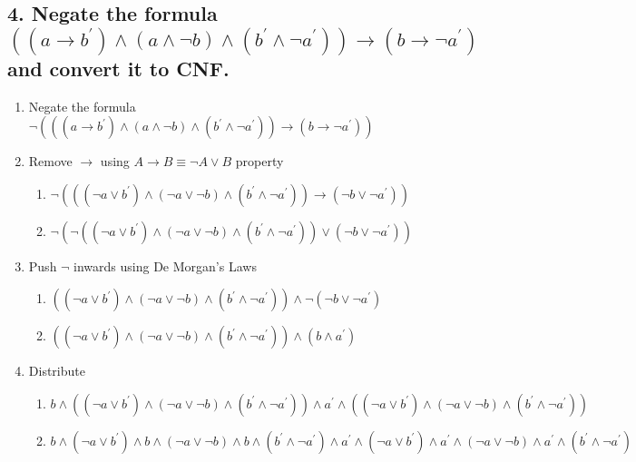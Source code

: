 \documentclass[a4paper, 14pt]{report}
\newcommand{\question}[1]{\subsection*{#1}}
\begin{document}
\question{4. Negate the formula $ ((a \rightarrow b^\prime) \wedge (a \wedge \neg b) \wedge (b^\prime \wedge \neg a^\prime)) \rightarrow (b \rightarrow \neg a^\prime) $  and convert it to CNF.\\ }

\begin{enumerate}

	\begin{enumerate}

		\item Negate the formula
			$ \neg (((a \rightarrow b^\prime) \wedge (a \wedge \neg b) \wedge (b^\prime \wedge \neg a^\prime)) \rightarrow (b \rightarrow \neg a^\prime)) $
		
		\item Remove $\rightarrow$ using $A \rightarrow B \equiv \neg A \vee B$ property

			\begin{enumerate}		
				\item $ \neg (((\neg a \vee b^\prime) \wedge (\neg a \vee \neg b) \wedge (b^\prime \wedge \neg a^\prime)) \rightarrow (\neg b \vee \neg a^\prime)) $ 
				\item $ \neg (\neg ((\neg a \vee b^\prime) \wedge (\neg a \vee \neg b) \wedge (b^\prime \wedge \neg a^\prime)) \vee (\neg b \vee \neg a^\prime)) $ 
			\end{enumerate}		

		\item Push $\neg$ inwards using De Morgan's Laws
		
			\begin{enumerate}		
				\item $ ((\neg a \vee b^\prime) \wedge (\neg a \vee \neg b) \wedge (b^\prime \wedge \neg a^\prime)) \wedge \neg (\neg b \vee \neg a^\prime) $
				\item $ ((\neg a \vee b^\prime) \wedge (\neg a \vee \neg b) \wedge (b^\prime \wedge \neg a^\prime)) \wedge (b \wedge a^\prime) $
			\end{enumerate}		

		\item Distribute

			\begin{enumerate}		
				\item $ b \wedge ((\neg a \vee b^\prime) \wedge (\neg a \vee \neg b) \wedge (b^\prime \wedge \neg a^\prime)) \wedge a^\prime \wedge  ((\neg a \vee b^\prime) \wedge (\neg a \vee \neg b) \wedge (b^\prime \wedge \neg a^\prime)) $ 
				\item $ b \wedge (\neg a \vee b^\prime) \wedge b \wedge (\neg a \vee \neg b) \wedge b \wedge (b^\prime \wedge \neg a^\prime) \wedge a^\prime \wedge (\neg a \vee b^\prime) \wedge a^\prime \wedge (\neg a \vee \neg b) \wedge a^\prime \wedge (b^\prime \wedge \neg a^\prime) $
			\end{enumerate}		


\end{enumerate}
\end{enumerate}
\end{document}
